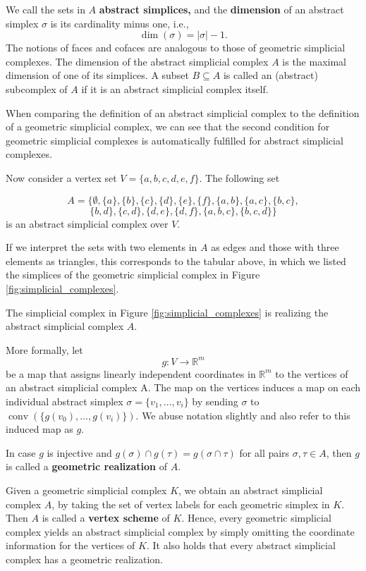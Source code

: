 We call the sets in $A$ \textbf{abstract simplices,} and the \textbf{dimension} of an abstract simplex $\sigma$ is its cardinality minus one, i.e.,\[ \operatorname{dim}(\sigma) = |\sigma| - 1.\]
The notions of faces and cofaces are analogous to those of geometric simplicial complexes.
The dimension of the abstract simplicial complex $A$ is the maximal dimension of one of its simplices. A subset $B \subseteq A$ is called an (abstract) subcomplex of $A$ if it is an abstract simplicial complex itself.

When comparing the definition of an abstract simplicial complex to the definition of a geometric simplicial complex, we can see that the second
condition for geometric simplicial complexes is automatically fulfilled for abstract simplicial complexes.


Now consider a vertex set $V = \{a,b,c,d,e,f\}$. The following set

\[
    A = \{\emptyset, \{a\}, \{b\}, \{c\}, \{d\}, \{e\}, \{f\}, \{a,b\}, \{a,c\}, \{b,c\},
\]
\[
 \{b,d\},\{c,d\},\{d,e\},\{d,f\},\{a,b,c\},\{b,c,d\}\}
\]
is an abstract simplicial complex over $V$. 

If we interpret the sets with two elements in $A$ as edges and those with three elements as triangles, this corresponds to the tabular above, in which we listed the simplices of the geometric simplicial complex in Figure \ref{fig:simplicial_complexes}.

The simplicial complex in Figure \ref{fig:simplicial_complexes} is realizing the abstract simplicial complex $A$. 

More formally, let \[g:V \rightarrow \mathbb{R}^m\] be a map that assigns linearly independent coordinates in $\mathbb{R}^m$ to the vertices of an abstract simplicial complex A. The map on the vertices induces a map on each individual abstract simplex $\sigma = \{v_1, \dots ,v_i\}$ by sending $\sigma$ to $\operatorname{conv}(\{g(v_0),\dots,g(v_i)\})$. We abuse notation slightly and also refer to this induced map as $g$. 

In case $g$ is injective and $g(\sigma)\cap g(\tau) = g(\sigma \cap \tau)$ for all pairs $\sigma, \tau \in A$, then $g$ is called a \textbf{geometric realization} of $A$. 

Given a geometric simplicial complex $K$, we obtain an abstract simplicial complex $A$, by taking the set of vertex labels for each geometric simplex in $K$. Then $A$ is called a \textbf{vertex scheme} of $K$. Hence, every geometric simplicial complex yields an abstract simplicial complex by simply omitting the coordinate information for the vertices of $K$. It also holds that every abstract simplicial complex has a geometric realization.  

